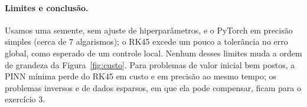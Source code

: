 \paragraph{Limites e conclusão.} Usamos uma semente, sem ajuste de hiperparâmetros, e o PyTorch em precisão simples
(cerca de 7 algarismos); o RK45 excede um pouco a tolerância no erro global, como esperado de um controle local.
Nenhum desses limites muda a ordem de grandeza da Figura~\ref{fig:custo}. Para problemas de valor inicial bem postos,
a PINN mínima perde do RK45 em custo e em precisão ao mesmo tempo; os problemas inversos e de dados esparsos, em que
ela pode compensar, ficam para o exercício 3.
